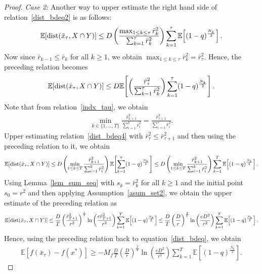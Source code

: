\documentclass{article}
\def\dist{{\rm dist}}
\newcommand{\EXP}[1]
{\mathbb{E}\!\left[#1\right] }
\theoremstyle{plain}
\theoremstyle{definition}
\theoremstyle{remark}
\begin{document}
\begin{proof}
\textit{Case 2:} Another way to upper estimate the right hand side of relation~\eqref{dist_bdeq2} is as follows:
\begin{align*}
    \EXP{\dist(\bar x_{\tau}, X \cap Y)} \leq D  \left(\frac{\max_{1 \leq k \leq \tau} \bar r_k^2}{\sum_{k=1}^\tau \bar r_k^2} \right) \sum_{k=1}^\tau \EXP{(1-q)^{\frac{N_{k}}{2}}}.
\end{align*}
Now since $\bar r_{k-1} \leq \bar r_k$ for all $k \geq 1$, we obtain $\max_{1 \leq k \leq \tau} \bar r_k^2 = \bar r_\tau^2$. Hence, the preceding relation becomes
\begin{align}
    \EXP{\dist(\bar x_{\tau}, X \cap Y)} \leq D \EXP{\left(\frac{\bar r_\tau^2}{\sum_{k=1}^\tau \bar r_k^2} \right) \sum_{k=1}^\tau (1-q)^{\frac{N_{k}}{2}}} . \label{dist_bdeq4}
\end{align}
Note that from relation~\eqref{indx_tau}, we obtain
\begin{align*}
    \min_{k \in \{1,\ldots,T\}} \frac{\bar r_{k+1}^2}{\sum_{i=1}^k \bar r_i^2} = \frac{\bar r_{\tau+1}^2}{\sum_{i=1}^\tau \bar r_i^2} .
\end{align*}
Upper estimating relation~\eqref{dist_bdeq4} with $\bar r_{\tau}^2 \leq \bar r_{\tau+1}^2$ and then using the preceding relation to it, we obtain
\begin{align}
    \EXP{\dist(\bar x_{\tau}, X \cap Y)} \leq D \left(\min_{1 \leq k \leq T} \frac{\bar r_{k+1}^2}{\sum_{i=1}^k \bar r_i^2} \right) \EXP{\sum_{k=1}^\tau (1-q)^{\frac{N_{k}}{2}}} \leq D \left(\min_{1 \leq k \leq T} \frac{\bar r_{k+1}^2}{\sum_{i=1}^k \bar r_i^2} \right) \sum_{k=1}^T \EXP{(1-q)^{\frac{N_{k}}{2}}} .
\end{align}
Using Lemma~\ref{lem_sum_seq} with $s_k = \bar r_k^2$ for all $k \geq 1$ and the initial point $s_0 = r^2$ and then applying Assumption~\ref{asum_set2}, we obtain the upper estimate of the preceding relation as
\begin{align*}
    \EXP{\dist(\bar x_{\tau}, X \cap Y)} \leq \frac{D}{T} \left(\frac{\bar r_{T+1}^2}{r^2}\right)^{\frac{1}{T}} \ln \left( \frac{e \bar r_{T+1}^2}{r^2} \right)\sum_{k=1}^T \EXP{(1-q)^{\frac{N_{k}}{2}}} \leq \frac{D}{T} \left( \frac{D}{r} \right)^{\frac{2}{T}} \ln \left( \frac{e D^2}{r^2} \right) \sum_{k=1}^T \EXP{(1-q)^{\frac{N_{k}}{2}}}.
\end{align*}
Hence, using the preceding relation back to equation~\eqref{dist_bdeq}, we obtain
\begin{align}
    \EXP{f(\bar x_\tau) - f(x^*)} \geq -M_f \frac{D}{T} \left( \frac{D}{r} \right)^{\frac{2}{T}} \ln \left( \frac{e D^2}{r^2} \right)\sum_{k=1}^T \EXP{(1-q)^{\frac{N_{k}}{2}}}. \nonumber

\end{align}
\end{proof}
\end{document}
